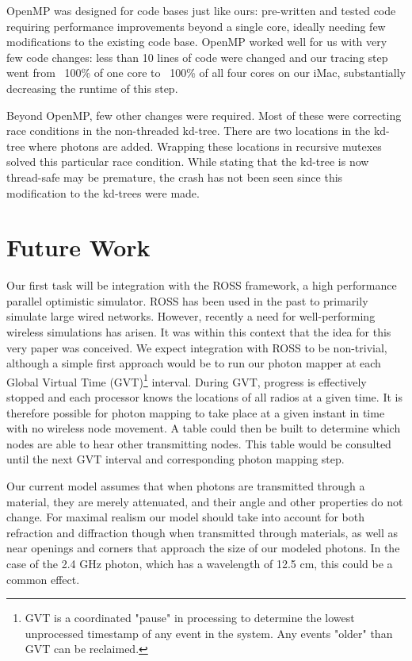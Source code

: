 \documentclass[%
        final,
        notitlepage,
        narroweqnarray,
        inline,
        twoside,
        ]{ieee}
\begin{document}
OpenMP \cite{Grama} was designed for code bases just like ours: pre-written and
tested code requiring performance improvements beyond a single core, ideally
needing few modifications to the existing code base.  OpenMP worked well for
us with very few code changes: less than 10 lines of code were changed and
our tracing step went from ~100\% of one core to ~100\% of all four cores on
our iMac, substantially decreasing the runtime of this step.

Beyond OpenMP, few other changes were required.  Most of these were correcting
race conditions in the non-threaded kd-tree.  There are two locations in the
kd-tree where photons are added.  Wrapping these locations in recursive
mutexes solved this particular race condition.  While stating that the kd-tree
is now thread-safe may be premature, the crash has not been seen since this
modification to the kd-trees were made.

\section{Future Work}

Our first task will be integration with the ROSS \cite{ross} framework, a high
performance parallel optimistic simulator.  ROSS has been used in the past to
primarily simulate large wired networks.  However, recently a need for
well-performing wireless simulations has arisen.  It was within this context
that the idea for this very paper was conceived.  We expect integration with
ROSS to be non-trivial, although a simple first approach would be to run our
photon mapper at each Global Virtual Time (GVT)\footnote{GVT is a coordinated
"pause" in processing to determine the lowest unprocessed timestamp of any
event in the system.  Any events "older" than GVT can be reclaimed.} interval.
During GVT, progress is effectively stopped and each processor knows the
locations of all radios at a given time.  It is therefore possible for photon
mapping to take place at a given instant in time with no wireless node movement.
A table could then be built to determine which nodes are able to hear other
transmitting nodes.  This table would be consulted until the next GVT interval
and corresponding photon mapping step.

Our current model assumes that when photons are transmitted through a material,
they are merely attenuated, and their angle and other properties do not change.
For maximal realism our model should take into account for both refraction and
diffraction though when transmitted through materials, as well as near openings and
corners that approach the size of our modeled photons. In the case of the 2.4 GHz photon,
which has a wavelength of 12.5 cm, this could be a common effect.
\end{document}
